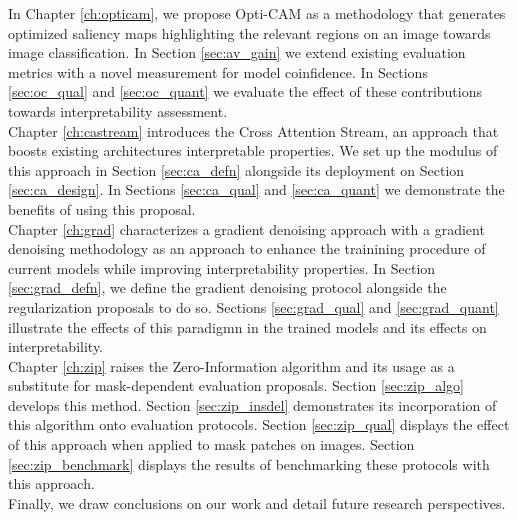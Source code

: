 \noindent In Chapter \ref{ch:opticam}, we propose Opti-CAM as a methodology that generates 
optimized saliency maps highlighting the relevant regions on an image towards image classification. 
In Section \ref{sec:av_gain} we extend existing evaluation metrics with a novel measurement for 
model coinfidence. 
In Sections \ref{sec:oc_qual} and \ref{sec:oc_quant} we evaluate the effect of these contributions 
towards interpretability assessment.\\

\noindent Chapter \ref{ch:castream} introduces the Cross Attention Stream, an approach that boosts existing 
architectures interpretable properties. We set up the modulus of this approach in 
Section \ref{sec:ca_defn} alongside its deployment on Section \ref{sec:ca_design}. 
In Sections \ref{sec:ca_qual} and \ref{sec:ca_quant} we demonstrate the benefits of using this
proposal.\\

\noindent Chapter \ref{ch:grad} characterizes a gradient denoising approach with a gradient denoising 
methodology as an approach to enhance the trainining procedure of current models while improving 
interpretability properties. In Section \ref{sec:grad_defn}, we define the gradient denoising 
protocol alongside the regularization proposals to do so.
Sections \ref{sec:grad_qual} and \ref{sec:grad_quant} illustrate the effects of this paradigmn
in the trained models and its effects on interpretability.\\

\noindent Chapter \ref{ch:zip} raises the Zero-Information algorithm and its usage as a substitute
for mask-dependent evaluation proposals. Section \ref{sec:zip_algo} develops this 
method. Section \ref{sec:zip_insdel} demonstrates its incorporation of this 
algorithm onto evaluation protocols. Section \ref{sec:zip_qual} displays
the effect of this approach when applied to mask patches on images. Section 
\ref{sec:zip_benchmark} displays the results of benchmarking these protocols 
with this approach. \\
    
\noindent Finally, we draw conclusions on our work and detail future research perspectives.